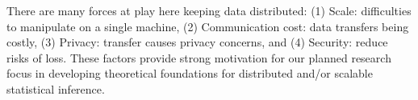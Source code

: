 \documentclass[12pt]{article}
\begin{document}
%
%
%
%
%
There are many forces at play here keeping data distributed:
(1) Scale: difficulties to manipulate on a single machine,
(2) Communication cost: data transfers being costly,
(3) Privacy: transfer causes privacy concerns, and
(4) Security: reduce risks of loss.
These factors provide strong motivation for our planned research focus in developing theoretical foundations for distributed and/or scalable statistical inference.
\end{document}
